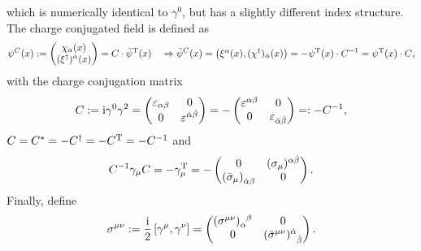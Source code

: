 which is numerically identical to $ \gamma^{0} $, but has a slightly different index structure.
The charge conjugated field is defined as
\begin{equation}
	\begin{aligned}
		\psi^{C} (x) := \begin{pmatrix}
			\chi_{\alpha} (x)\\
			(\xi^{\dagger})^{\dot{\alpha}} (x)
		\end{pmatrix}
		= C \cdot \bar{\psi}^{\mathrm{T}} (x) 
		\quad \Rightarrow
		\bar{\psi}^{C} (x) = \begin{pmatrix}
			\xi^{\alpha} (x), (\chi^{\dagger})_{\dot{\alpha}} (x)
		\end{pmatrix}
		= - \psi^{\mathrm{T}}(x) \cdot C^{-1} = \psi^{\mathrm{T}}(x) \cdot C
		\text{,}
	\end{aligned}
\end{equation}
with the charge conjugation matrix
\begin{equation}
	\begin{aligned}
		C := \mathrm{i} \gamma^{0} \gamma^{2} = \begin{pmatrix}
			\varepsilon_{\alpha \beta} & 0\\
			0 & \varepsilon^{\dot{\alpha} \dot{\beta}}
		\end{pmatrix}
		= - \begin{pmatrix}
			\varepsilon^{\alpha \beta} & 0\\
			0 & \varepsilon_{\dot{\alpha} \dot{\beta}}
		\end{pmatrix}
		=: - C^{-1},
	\end{aligned} \label{eq:ChargeConjugation}
\end{equation}
$ C = C^{*} = - C^{\dagger} = - C^{\mathrm{T}} = - C^{-1} $ and
\begin{equation}
	\begin{aligned}
		C^{-1} \gamma_{\mu} C = - \gamma_{\mu}^{\trans}
		= - \begin{pmatrix}
			0 & \tensor{(\sigma_{\mu})}{^{\alpha \dot{\beta}}} \\
			\tensor{(\bar{\sigma}_{\mu})}{_{\dot{\alpha} \beta}} & 0
		\end{pmatrix}
		\text{.}
	\end{aligned}
\end{equation}
Finally, define
\begin{equation}
	\begin{aligned}
		\sigma^{\mu \nu} := \frac{\mi}{2} \left[\gamma^{\mu}, \gamma^{\nu} \right] = \begin{pmatrix}
			\tensor{(\sigma^{\mu \nu})}{_{\alpha} ^{\beta}} & 0 \\
			0 & \tensor{(\bar{\sigma}^{\mu \nu})}{^{\dot{\alpha}} _{\dot{\beta}}}
		\end{pmatrix}.
	\end{aligned}
\end{equation}
